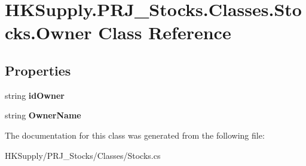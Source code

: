 \hypertarget{class_h_k_supply_1_1_p_r_j___stocks_1_1_classes_1_1_stocks_1_1_owner}{}\section{H\+K\+Supply.\+P\+R\+J\+\_\+\+Stocks.\+Classes.\+Stocks.\+Owner Class Reference}
\label{class_h_k_supply_1_1_p_r_j___stocks_1_1_classes_1_1_stocks_1_1_owner}
\subsection*{Properties}
\begin{DoxyCompactItemize}
\item 
\mbox{\label{class_h_k_supply_1_1_p_r_j___stocks_1_1_classes_1_1_stocks_1_1_owner_af04d5acf4ca0ed1f75942e28b5f6b9cf}} 
string {\bfseries id\+Owner}
\item 
\mbox{\label{class_h_k_supply_1_1_p_r_j___stocks_1_1_classes_1_1_stocks_1_1_owner_a745debcfdf6d9357b254133b556de91e}} 
string {\bfseries Owner\+Name}
\end{DoxyCompactItemize}


The documentation for this class was generated from the following file\+:\begin{DoxyCompactItemize}
\item 
H\+K\+Supply/\+P\+R\+J\+\_\+\+Stocks/\+Classes/Stocks.\+cs\end{DoxyCompactItemize}

